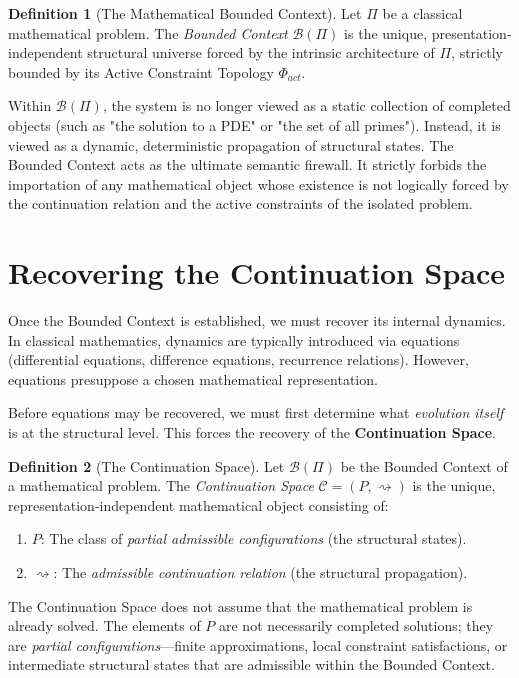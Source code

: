 \documentclass[12pt,openany]{extbook}
\theoremstyle{plain}
\theoremstyle{definition}
\newtheorem{definition}{Definition}[chapter]
\begin{document}
\begin{definition}[The Mathematical Bounded Context]
Let $\Pi$ be a classical mathematical problem. The \emph{Bounded Context} $\mathcal{B}(\Pi)$ is the unique, presentation-independent structural universe forced by the intrinsic architecture of $\Pi$, strictly bounded by its Active Constraint Topology $\Phi_{act}$.
\end{definition}

Within $\mathcal{B}(\Pi)$, the system is no longer viewed as a static collection of completed objects (such as "the solution to a PDE" or "the set of all primes"). Instead, it is viewed as a dynamic, deterministic propagation of structural states. The Bounded Context acts as the ultimate semantic firewall. It strictly forbids the importation of any mathematical object whose existence is not logically forced by the continuation relation and the active constraints of the isolated problem.

\section{Recovering the Continuation Space}

Once the Bounded Context is established, we must recover its internal dynamics. In classical mathematics, dynamics are typically introduced via equations (differential equations, difference equations, recurrence relations). However, equations presuppose a chosen mathematical representation. 

Before equations may be recovered, we must first determine what \emph{evolution itself} is at the structural level. This forces the recovery of the \textbf{Continuation Space}.

\begin{definition}[The Continuation Space]
Let $\mathcal{B}(\Pi)$ be the Bounded Context of a mathematical problem. The \emph{Continuation Space} $\mathcal{C} = (P, \rightsquigarrow)$ is the unique, representation-independent mathematical object consisting of:
\begin{enumerate}
    \item $P$: The class of \emph{partial admissible configurations} (the structural states).
    \item $\rightsquigarrow$: The \emph{admissible continuation relation} (the structural propagation).
\end{enumerate}
\end{definition}

The Continuation Space does not assume that the mathematical problem is already solved. The elements of $P$ are not necessarily completed solutions; they are \emph{partial configurations}---finite approximations, local constraint satisfactions, or intermediate structural states that are admissible within the Bounded Context.
\end{document}
